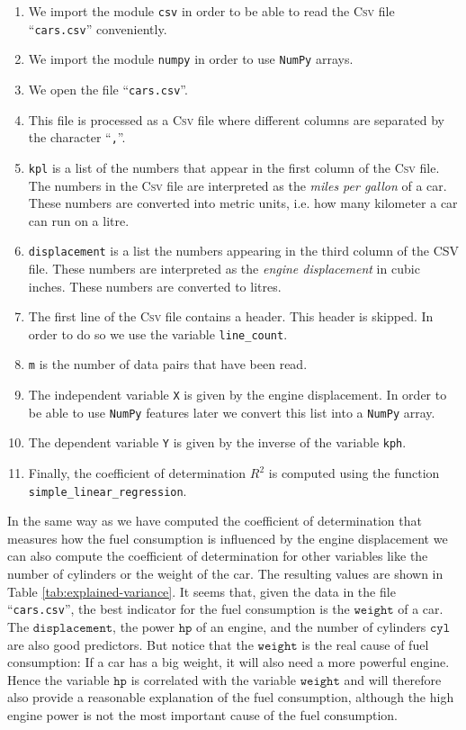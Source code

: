 \begin{enumerate}
\item We import the module \texttt{csv} in order to be able to read the \textsc{Csv} file ``\texttt{cars.csv}''
      conveniently.
\item We import the module \texttt{numpy} in order to use \texttt{NumPy} arrays.
\item We open the file ``\texttt{cars.csv}''.
\item This file is processed as a \textsc{Csv} file where different columns are separated by the character 
      ``\texttt{,}''.
\item \texttt{kpl} is a list of the numbers that appear in the first column of the \textsc{Csv} file.
      The numbers in the \textsc{Csv} file are interpreted as the \emph{miles per gallon} of a car.
      These numbers are converted into metric units, i.e. how many kilometer a car can run on a litre.
\item \texttt{displacement} is a list the numbers appearing in the third column of the \textsc{CSV} file.
      These numbers are interpreted as the \emph{engine displacement} in cubic inches.
      These numbers are converted to litres.
\item The first line of the \textsc{Csv} file contains a header.  This header is skipped.
      In order to do so we use the variable \texttt{line\_count}.
\item \texttt{m} is the number of data pairs that have been read.
\item The independent variable \texttt{X} is given by the engine displacement. 
      In order to be able to use \texttt{NumPy} features later we convert this list into a \texttt{NumPy} array.
\item The dependent variable \texttt{Y} is given by the inverse of the variable \texttt{kph}.
\item Finally, the coefficient of determination $R^2$ is computed using the function \texttt{simple\_linear\_regression}.
\end{enumerate}
In the same way as we have computed the coefficient of determination that measures how the fuel consumption is
influenced by the engine displacement we can also compute the coefficient of determination for other variables
like the number of cylinders or the weight of the car.  
The resulting values are shown in Table \ref{tab:explained-variance}.  It
seems that, given the data in the file ``\texttt{cars.csv}'', the best indicator for the fuel consumption is
the $\mathtt{weight}$ of a car.  The $\mathtt{displacement}$, the power $\mathtt{hp}$ of an engine, and the
number of cylinders $\mathtt{cyl}$ are also good predictors.  But notice that the $\mathtt{weight}$ is the real
cause of fuel consumption:  If a car has a big weight, it will also need a more powerful engine.  Hence the
variable $\mathtt{hp}$ is correlated with the variable $\mathtt{weight}$ and will therefore also provide a
reasonable explanation of the fuel consumption, although the high engine power is not the most important cause
of the fuel consumption. 


